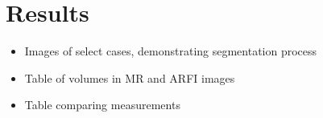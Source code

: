 \section{Results}\label{sect:results}

\begin{itemize}
    \item Images of select cases, demonstrating segmentation process
    \item Table of volumes in MR and ARFI images
    \item Table comparing measurements
\end{itemize}

